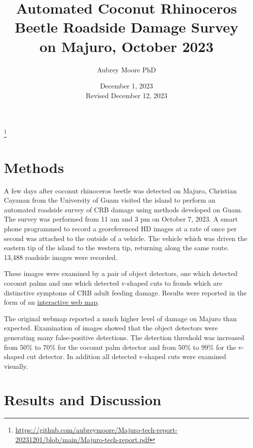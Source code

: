 \documentclass[12pt,letterpaper,english,bibliography=totocnumbered, abstract=on]{scrartcl}
\begin{document}
\titlehead{DRAFT TECHNICAL REPORT}

\title{Automated Coconut Rhinoceros Beetle Roadside Damage Survey on Majuro, October 2023}

\author{Aubrey Moore PhD}

\date{December 1, 2023\\Revised December 12, 2023}

\maketitle

\footnote{\url{https://github.com/aubreymoore/Majuro-tech-report-20231201/blob/main/Majuro-tech-report.pdf}}


\pagebreak

\section{Methods}

A few days after coconut rhinoceros beetle was detected on Majuro, Christian Cayanan from the University of Guam visited the island to perform an automated roadside survey of CRB damage using methods developed on Guam. The survey was performed from 11 am and 3 pm on October 7, 2023. A smart phone programmed to record a georeferenced HD images at a rate of once per second was attached to the outside of a vehicle. The vehicle which was driven the eastern tip of the island to the western tip, returning along the same route. 13,488 roadside images were recorded.

These images were examined by a pair of object detectors, one which detected coconut palms and one which detected v-shaped cuts to fronds which are distinctive symptoms of CRB adult feeding damage. Results were reported in the form of an \href{https://aubreymoore.github.io/Majuro-CRB-Damage-Map-2023-10/webmap/#12/7.1098/171.2099}{interactive web map}. 

The original webmap reported a much higher level of damage on Majuro than expected. Examination of images showed that the object detectors were generating many false-positive detections. The detection threshold was increased from 50\% to 70\% for the coconut palm detector and from 50\% to 99\% for the v-shaped cut detector. In addition all detected v-shaped cuts were examined visually.

\section{Results and Discussion}
\end{document}
